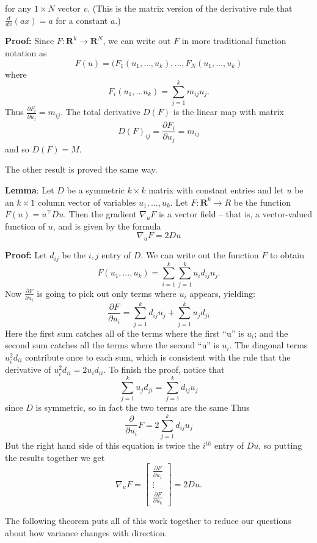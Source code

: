 \documentclass[
  11pt,
  letterpaper,
]{scrbook}
\newcommand{\df}[1]{\frac{\partial}{\partial #1}}
\theoremstyle{plain}
\theoremstyle{plain}
\theoremstyle{remark}
\begin{document}
for any \(1\times N\) vector \(v\). (This is the matrix version of the
derivative rule that \(\frac{d}{dx}(ax)=a\) for a constant \(a\).)

\textbf{Proof:} Since \(F:\mathbf{R}^{k}\to\mathbf{R}^{N}\), we can
write out \(F\) in more traditional function notation as \[
F(u) = (F_{1}(u_1,\ldots, u_k), \ldots, F_{N}(u_1,\ldots, u_{k})
\] where \[
F_{i}(u_1,\ldots u_k) = \sum_{j=1}^{k} m_{ij}u_{j}.
\] Thus \(\frac{\partial F_{i}}{\partial u_{j}} = m_{ij}\). The total
derivative \(D(F)\) is the linear map with matrix \[
D(F)_{ij} = \frac{\partial F_{i}}{\partial u_{j}} = m_{ij}
\] and so \(D(F)=M\).

The other result is proved the same way.

\textbf{Lemma}: Let \(D\) be a symmetric \(k\times k\) matrix with
constant entries and let \(u\) be an \(k\times 1\) column vector of
variables \(u_{1},\ldots, u_{k}\). Let \(F:\mathbf{R}^{k}\to R\) be the
function \(F(u) = u^{\intercal}Du\). Then the gradient \(\nabla_{u} F\)
is a vector field -- that is, a vector-valued function of \(u\), and is
given by the formula \[
\nabla_{u} F = 2Du
\]

\textbf{Proof:} Let \(d_{ij}\) be the \(i,j\) entry of \(D\). We can
write out the function \(F\) to obtain \[
F(u_1,\ldots, u_{k}) = \sum_{i=1}^{k} \sum_{j=1}^{k} u_i d_{ij} u_j.
\] Now \(\frac{\partial F}{\partial u_{i}}\) is going to pick out only
terms where \(u_{i}\) appears, yielding: \[
\frac{\partial F}{\partial u_{i}} = \sum_{j=1}^{k} d_{ij}u_{j} + \sum_{j=1}^{k} u_{j}d_{ji}
\] Here the first sum catches all of the terms where the first ``u'' is
\(u_{i}\); and the second sum catches all the terms where the second
``u'' is \(u_{i}\). The diagonal terms \(u_{i}^2d_{ii}\) contribute once
to each sum, which is consistent with the rule that the derivative of
\(u_{i}^2d_{ii} = 2u_{i}d_{ii}\). To finish the proof, notice that \[
\sum_{j=1}^{k} u_{j}d_{ji} = \sum_{j=1}^{k} d_{ij}u_{j}
\] since \(D\) is symmetric, so in fact the two terms are the same Thus
\[
\df{u_{i}}F = 2\sum_{j=1}^{k} d_{ij}u_{j}
\] But the right hand side of this equation is twice the \(i^{th}\)
entry of \(Du\), so putting the results together we get \[
\nabla_{u}F = \left[\begin{matrix} \frac{\partial F}{\partial u_{1}} \\ \vdots \\ \frac{\partial F}{\partial u_{k}}\end{matrix}\right] = 2Du.
\]

The following theorem puts all of this work together to reduce our
questions about how variance changes with direction.
\end{document}
